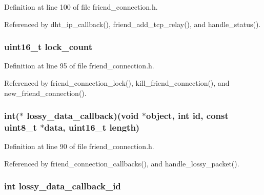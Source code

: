 Definition at line 100 of file friend\+\_\+connection.\+h.



Referenced by dht\+\_\+ip\+\_\+callback(), friend\+\_\+add\+\_\+tcp\+\_\+relay(), and handle\+\_\+status().

\hypertarget{struct_friend___conn_a712c4c639bfc0f5a8616eead3e24ca4e}{
\subsubsection[{lock\+\_\+count}]{\setlength{\rightskip}{0pt plus 5cm}uint16\+\_\+t lock\+\_\+count}}\label{struct_friend___conn_a712c4c639bfc0f5a8616eead3e24ca4e}


Definition at line 95 of file friend\+\_\+connection.\+h.



Referenced by friend\+\_\+connection\+\_\+lock(), kill\+\_\+friend\+\_\+connection(), and new\+\_\+friend\+\_\+connection().

\hypertarget{struct_friend___conn_a12463710aaaa4801d03d6fe347d16e3e}{
\subsubsection[{lossy\+\_\+data\+\_\+callback}]{\setlength{\rightskip}{0pt plus 5cm}int($\ast$ lossy\+\_\+data\+\_\+callback)(void $\ast$object, int id, const uint8\+\_\+t $\ast$data, uint16\+\_\+t length)}}\label{struct_friend___conn_a12463710aaaa4801d03d6fe347d16e3e}


Definition at line 90 of file friend\+\_\+connection.\+h.



Referenced by friend\+\_\+connection\+\_\+callbacks(), and handle\+\_\+lossy\+\_\+packet().

\hypertarget{struct_friend___conn_a5c67a04bbd12eda4d5fe29f10d082bec}{
\subsubsection[{lossy\+\_\+data\+\_\+callback\+\_\+id}]{\setlength{\rightskip}{0pt plus 5cm}int lossy\+\_\+data\+\_\+callback\+\_\+id}}\label{struct_friend___conn_a5c67a04bbd12eda4d5fe29f10d082bec}


